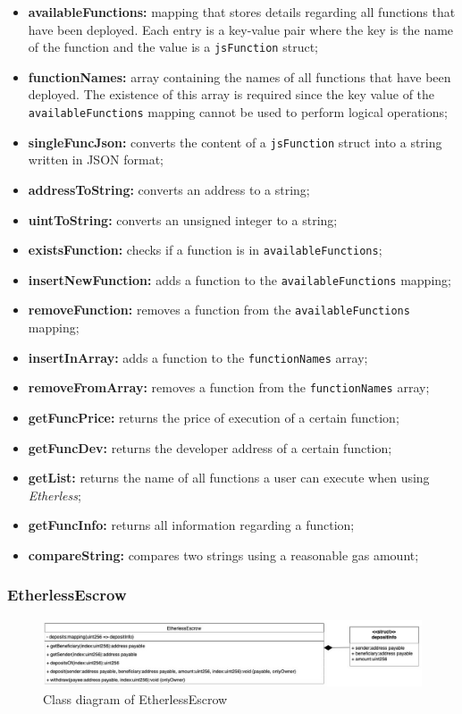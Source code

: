 	\begin{itemize}
		\item \textbf{availableFunctions:} mapping that stores details regarding all functions that have been deployed. Each entry is a key-value pair where the key is the name of the function and the value is a \texttt{jsFunction} struct;
		\item \textbf{functionNames:} array containing the names of all functions that have been deployed. The existence of this array is required since the key value of the \texttt{availableFunctions} mapping cannot be used to perform logical operations;
	\end{itemize}
	\begin{itemize}
		\item \textbf{singleFuncJson:} converts the content of a \texttt{jsFunction} struct into a string written in JSON format;
		\item \textbf{addressToString:} converts an address to a string;
		\item \textbf{uintToString:} converts an unsigned integer to a string;
		\item \textbf{existsFunction:} checks if a function is in \texttt{availableFunctions};
		\item \textbf{insertNewFunction:} adds a function to the \texttt{availableFunctions} mapping;
		\item \textbf{removeFunction:} removes a function from the \texttt{availableFunctions} mapping;
		\item \textbf{insertInArray:} adds a function to the \texttt{functionNames} array;
		\item \textbf{removeFromArray:} removes a function from the \texttt{functionNames} array;
		\item \textbf{getFuncPrice:} returns the price of execution of a certain function;
		\item \textbf{getFuncDev:} returns the developer address of a certain function;
		\item \textbf{getList:} returns the name of all functions a user can execute when using \textit{Etherless};
		\item \textbf{getFuncInfo:} returns all information regarding a function;
		\item \textbf{compareString:} compares two strings using a reasonable gas amount;
	\end{itemize}
		
\subsubsection{EtherlessEscrow}
	\begin{figure}[H]
		\centering
		\includegraphics[width=1\linewidth]{diagrammi/etherless-smart/EtherlessEscrow.jpg}
		\caption{Class diagram of EtherlessEscrow}
	\end{figure}

